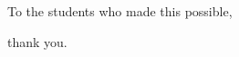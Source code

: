 \begin{center}
{\alegreyafont To the students who made this possible,

\alegreyafont thank you.}
\end{center}
